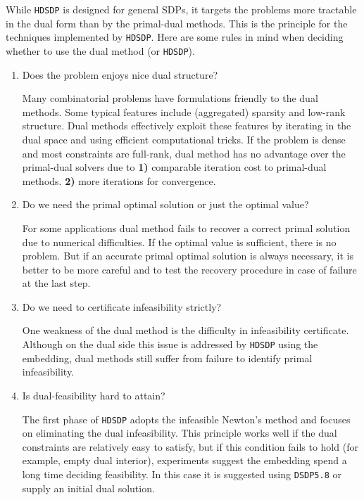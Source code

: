 While {{\texttt{HDSDP}}} is designed for general SDPs, it targets the problems
more tractable in the dual form than by the primal-dual methods. This is
the principle for the techniques implemented by {{\texttt{HDSDP}}}.
Here are some rules in mind when deciding whether to use the dual method (or
{{\texttt{HDSDP}}}).
\begin{enumerate}[leftmargin=20pt]
  \item Does the problem enjoys nice dual structure?
  
  Many combinatorial problems have formulations friendly to the dual methods.
  Some typical features include (aggregated) sparsity and low-rank structure.
  Dual methods effectively exploit these features by iterating in the dual space and
  using efficient computational tricks. If the problem is dense and most
  constraints are full-rank, dual method has no advantage over the primal-dual
  solvers due to {\textbf{1)}} comparable iteration cost to primal-dual
  methods. {\textbf{2)}} more iterations for convergence.
  
  \item Do we need the primal optimal solution or just the optimal value?
  
  For some applications dual method fails to recover a correct primal solution
  due to numerical difficulties. If the optimal value is sufficient, there is
  no problem. But if an accurate primal optimal solution is always necessary,
  it is better to be more careful and to test the recovery procedure in case
  of failure at the last step.
  
  \item Do we need to certificate infeasibility strictly?
  
  One weakness of the dual method is the difficulty in infeasibility
  certificate. Although on the dual side this issue is addressed by
  {{\texttt{HDSDP}}} using the embedding, dual methods still suffer from
  failure to identify primal infeasibility.
  
  \item Is dual-feasibility hard to attain?
  
  The first phase of {{\texttt{HDSDP}}} adopts the infeasible Newton's method
  and focuses on eliminating the dual infeasibility. This principle works well
  if the dual constraints are relatively easy to satisfy, but if this
  condition fails to hold (for example, empty dual interior), experiments suggest the embedding
  spend a long time deciding feasibility. In this case it is suggested using
  {{\texttt{DSDP5.8}}} or supply an initial dual solution.
\end{enumerate}